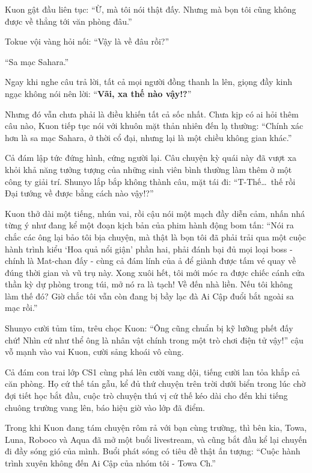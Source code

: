 \documentclass[../main.tex]{subfiles}
\begin{document}
Kuon gật đầu liên tục: ``Ừ, mà tôi nói thật đấy. Nhưng mà bọn tôi cũng không được về thẳng tới văn phòng đâu.''

Tokue vội vàng hỏi nối: ``Vậy là về đâu rồi?''

``Sa mạc Sahara.''

Ngay khi nghe câu trả lời, tất cả mọi người đồng thanh la lên, giọng đầy kinh ngạc không nói nên lời: ``\textbf{Vãi, xa thế nào vậy!?}''

Nhưng đó vẫn chưa phải là điều khiến tất cả sốc nhất. Chưa kịp có ai hỏi thêm câu nào, Kuon tiếp tục nói với khuôn mặt thản nhiên đến lạ thường: ``Chính xác hơn là sa mạc Sahara, ở thời cổ đại, nhưng lại là một chiều không gian khác.''

Cả đám lập tức đứng hình, cứng người lại. Câu chuyện kỳ quái này đã vượt xa khỏi khả năng tưởng tượng của những sinh viên bình thường làm thêm ở một công ty giải trí. Shunyo lắp bắp không thành câu, mặt tái đi: ``T-Thế\dots\ thế rồi Đại tướng về được bằng cách nào vậy!?''

Kuon thở dài một tiếng, nhún vai, rồi cậu nói một mạch đầy diễn cảm, nhấn nhá từng ý như đang kể một đoạn kịch bản của phim hành động bom tấn: ``Nói ra chắc các ông lại bảo tôi bịa chuyện, mà thật là bọn tôi đã phải trải qua một cuộc hành trình kiểu `Hoa quả nổi giận' phần hai, phải đánh bại đủ mọi loại boss - chính là Mat-chan đấy - cùng cả đám lính của ả để giành được tấm vé quay về đúng thời gian và vũ trụ này. Xong xuôi hết, tôi mới móc ra được chiếc cánh cửa thần kỳ dự phòng trong túi, mở nó ra là tạch! Về đến nhà liền. Nếu tôi không làm thế đó? Giờ chắc tôi vẫn còn đang bị bầy lạc đà Ai Cập đuổi bắt ngoài sa mạc rồi.''

Shunyo cười tủm tỉm, trêu chọc Kuon: ``Ông cũng chuẩn bị kỹ lưỡng phết đấy chứ! Nhìn cứ như thể ông là nhân vật chính trong một trò chơi điện tử vậy!'' cậu vỗ mạnh vào vai Kuon, cười sảng khoái vô cùng.

Cả đám con trai lớp CS1 cùng phá lên cười vang dội, tiếng cười lan tỏa khắp cả căn phòng. Họ cứ thế tán gẫu, kể đủ thứ chuyện trên trời dưới biển trong lúc chờ đợi tiết học bắt đầu, cuộc trò chuyện thú vị cứ thế kéo dài cho đến khi tiếng chuông trường vang lên, báo hiệu giờ vào lớp đã điểm.

\ct

Trong khi Kuon đang tám chuyện rôm rả với bạn cùng trường, thì bên kia, Towa, Luna, Roboco và Aqua đã mở một buổi livestream, và cũng bắt đầu kể lại chuyến đi đầy sóng gió của mình. Buổi phát sóng có tiêu đề thật ấn tượng: ``Cuộc hành trình xuyên không đến Ai Cập của nhóm tôi - Towa Ch.''
\end{document}
